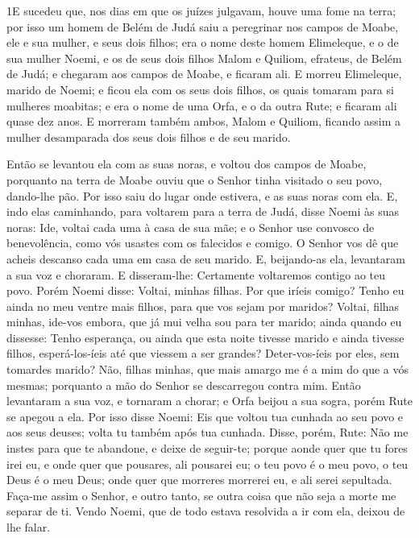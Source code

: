 
\lettrine{1} E sucedeu que, nos dias em que os juízes
julgavam, houve uma fome na terra; por isso um homem de Belém de
Judá saiu a peregrinar nos campos de Moabe, ele e sua mulher, e seus
dois filhos; era o nome deste homem Elimeleque, e o de sua
mulher Noemi, e os de seus dois filhos Malom e Quiliom, efrateus, de
Belém de Judá; e chegaram aos campos de Moabe, e ficaram ali. E
morreu Elimeleque, marido de Noemi; e ficou ela com os seus dois
filhos, os quais tomaram para si mulheres moabitas; e era o nome
de uma Orfa, e o da outra Rute; e ficaram ali quase dez anos. E
morreram também ambos, Malom e Quiliom, ficando assim a mulher
desamparada dos seus dois filhos e de seu marido.

Então se levantou ela com as suas noras, e voltou dos campos de
Moabe, porquanto na terra de Moabe ouviu que o Senhor tinha visitado
o seu povo, dando-lhe pão. Por isso saiu do lugar onde estivera,
e as suas noras com ela. E, indo elas caminhando, para voltarem para
a terra de Judá, disse Noemi às suas noras: Ide, voltai cada uma
à casa de sua mãe; e o Senhor use convosco de benevolência, como vós
usastes com os falecidos e comigo. O Senhor vos dê que acheis
descanso cada uma em casa de seu marido. E, beijando-as ela,
levantaram a sua voz e choraram. E disseram-lhe: Certamente
voltaremos contigo ao teu povo. Porém Noemi disse: Voltai,
minhas filhas. Por que iríeis comigo? Tenho eu ainda no meu ventre
mais filhos, para que vos sejam por maridos? Voltai, filhas
minhas, ide-vos embora, que já mui velha sou para ter marido; ainda
quando eu dissesse: Tenho esperança, ou ainda que esta noite tivesse
marido e ainda tivesse filhos, esperá-los-íeis até que
viessem a ser grandes? Deter-vos-íeis por eles, sem tomardes marido?
Não, filhas minhas, que mais amargo me é a mim do que a vós mesmas;
porquanto a mão do Senhor se descarregou contra mim. Então
levantaram a sua voz, e tornaram a chorar; e Orfa beijou a sua
sogra, porém Rute se apegou a ela. Por isso disse Noemi: Eis
que voltou tua cunhada ao seu povo e aos seus deuses; volta tu
também após tua cunhada. Disse, porém, Rute: Não me instes
para que te abandone, e deixe de seguir-te; porque aonde quer que tu
fores irei eu, e onde quer que pousares, ali pousarei eu; o teu povo
é o meu povo, o teu Deus é o meu Deus; onde quer que morreres
morrerei eu, e ali serei sepultada. Faça-me assim o Senhor, e outro
tanto, se outra coisa que não seja a morte me separar de ti.
Vendo Noemi, que de todo estava resolvida a ir com ela,
deixou de lhe falar.

